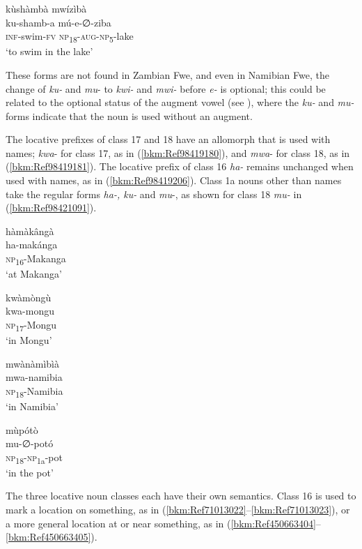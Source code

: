\ea
\label{bkm:Ref98418739}
kùshàmbà mwízìbà\\
\gll ku-shamb-a    mú-e-∅-ziba\\
\textsc{inf}-swim-\textsc{fv}   \textsc{np}\textsubscript{18}-\textsc{aug}-\textsc{np}\textsubscript{5}-lake\\
\glt ‘to swim in the lake’
\z

These forms are not found in Zambian Fwe, and even in Namibian Fwe, the change of \textit{ku-} and \textit{mu}- to \textit{kwi-} and \textit{mwi-} before \textit{e-} is optional; this could be related to the optional status of the augment vowel (see ), where the \textit{ku-} and \textit{mu-} forms indicate that the noun is used without an augment.

The locative prefixes of class 17 and 18 have an allomorph that is used with names; \textit{kwa}- for class 17, as in (\ref{bkm:Ref98419180}), and \textit{mwa}- for class 18, as in (\ref{bkm:Ref98419181}). The locative prefix of class 16 \textit{ha-} remains unchanged when used with names, as in (\ref{bkm:Ref98419206}). Class 1a nouns other than names take the regular forms \textit{ha-, ku-} and \textit{mu}-, as shown for class 18 \textit{mu-} in (\ref{bkm:Ref98421091}).

\ea
\label{bkm:Ref98419180}
\glll hàmàkângà\\
ha-makánga\\
\textsc{np}\textsubscript{16}-Makanga\\
\glt ‘at Makanga’
\z

\ea
\label{bkm:Ref98419181}
\glll kwàmòngù\\
kwa-mongu\\
\textsc{np}\textsubscript{17}-Mongu\\
\glt ‘in Mongu’
\z

\ea
\label{bkm:Ref98419206}
\glll mwànàmìbìà\\
mwa-namibia\\
\textsc{np}\textsubscript{18}-Namibia\\
\glt ‘in Namibia’
\z

\ea
\label{bkm:Ref98421091}
\glll mùpótò\\
mu-∅-potó\\
\textsc{np}\textsubscript{18}-\textsc{np}\textsubscript{1a}-pot\\
\glt ‘in the pot’
\z

The three locative noun classes each have their own semantics. Class 16 is used to mark a location on something, as in (\ref{bkm:Ref71013022}--\ref{bkm:Ref71013023}), or a more general location at or near something, as in (\ref{bkm:Ref450663404}--\ref{bkm:Ref450663405}).

